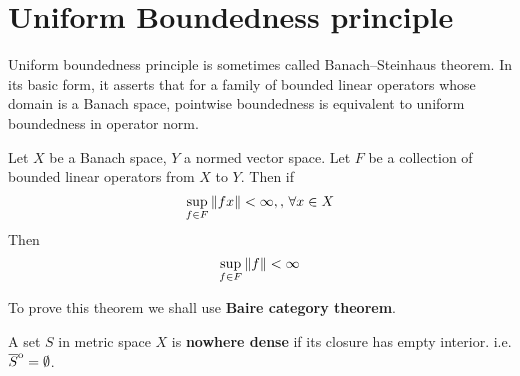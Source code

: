 \newpage
\section{Uniform Boundedness principle}
Uniform boundedness principle is sometimes called Banach–Steinhaus theorem. In its basic form, it asserts that for a family of bounded linear operators  whose domain is a Banach space, pointwise boundedness is equivalent to uniform boundedness in operator norm.

\begin{theorem}\rm
	Let $X$ be a Banach space, $Y$ a normed vector space. Let $F$ be a collection of bounded linear operators from $X$ to $Y$. Then if
	$$
		\sup_{f\in F}\left\|{fx}\right\|<\infty,,\,\forall x\in X
	$$
	Then
	$$
		\sup_{f\in F}\left\|{f}\right\|<\infty
	$$
\end{theorem}
To prove this theorem we shall use {\textbf{Baire category theorem}}.

\begin{definition}\rm
	A set $S$ in metric space $X$ is {\bf nowhere dense} if its closure has empty interior. i.e. $\overline{S}\strut^\mathrm{o}=\emptyset$.
\end{definition}

